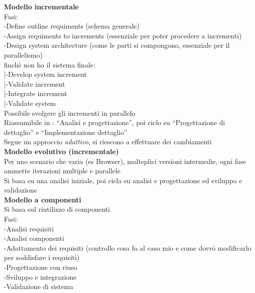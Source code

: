 \documentclass{article}
\begin{document}
		\textbf{Modello incrementale}\\
		Fasi:\\
		-Define outline requiments (schema generale)\\
		-Assign requiments to increments (essenziale per poter procedere a incrementi)\\
		-Design system architecture (come le parti si compongono, essenziale per il parallelismo)\\
		finchè non ho il sistema finale:\\
		|-Develop system increment\\
		|-Validate increment\\
		|-Integrate increment\\
		|-Validate system\\
		Possibile svolgere gli incrementi in parallelo\\
		Riassumibile in : ``Analisi e progettazione'', poi ciclo su ``Progettazione di dettaglio'' e ``Implementazione dettaglio''\\
		Segue un approccio \textit{adattivo}, si riescono a effettuare dei cambiamenti\\
		
		\textbf{Modello evolutivo (incrementale)}\\
		Per uno scenario che varia (es Browser), molteplici versioni intermedie, ogni fase ammette iterazioni multiple e parallele\\
		Si basa su una analisi iniziale, poi cicla su analisi e progettazione ed sviluppo e validazione\\
		
		\textbf{Modello a componenti}\\
		Si basa sul riutilizzo di componenti\\
		Fasi:\\
		-Analisi requisiti\\
		-Analisi componenti\\
		-Adattamento dei requisiti (controllo cosa fa al caso mio e come dovrò modificarlo per soddisfare i requisiti)\\
		-Progettazione con riuso\\
		-Sviluppo e integrazione\\
		-Validazione di sistema\\
		
\end{document}
